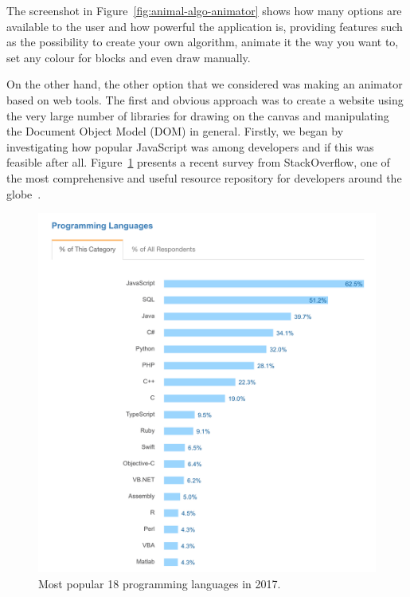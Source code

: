 \documentclass{l4proj}
\begin{document}
The screenshot in Figure~\ref{fig:animal-algo-animator} shows how many options are available to the user and how powerful the application is, providing
features such as the possibility to create
your own algorithm, animate it the way you want to, set any colour for blocks and even draw manually.

On the other hand, the other option that we considered was making an animator based on web tools. The first and obvious
approach was to create a website using the very large number of libraries for drawing on the canvas and manipulating
the Document Object Model (DOM) in general. Firstly, we began by investigating how popular JavaScript was among developers and if this was
feasible after all. Figure~\ref{fig:stack-overflow-languages} presents a recent survey from StackOverflow, one of the most comprehensive and useful resource repository for developers around
the globe~\cite{stackoverflow-survey}.

\begin{figure}[!ht]
    \centering
    \includegraphics[scale=0.5]{stack-overflow-languages}
    \caption{Most popular 18 programming languages in 2017.}
    \label{fig:stack-overflow-languages}
\end{figure}
\end{document}
